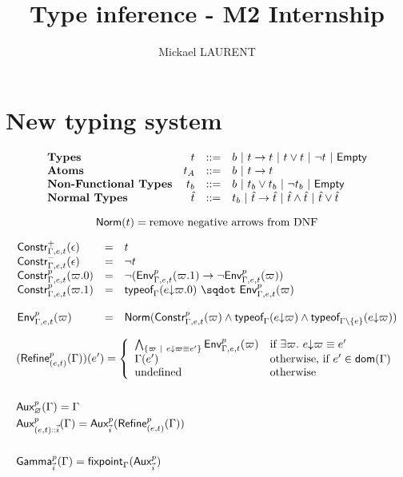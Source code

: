 \documentclass[a4paper]{article}
\title{\vspace{1.5cm}Type inference - M2 Internship}
\author{Mickael LAURENT}
\date{\vspace{-5ex}}
\theoremstyle{definition}
\begin{document}
	\maketitle

    \section{New typing system}

    \[
      \begin{array}{lrcl}
      \textbf{Types} & t & ::= & b~|~ t\to t~|~ t\vee t ~|~ \neg t ~|~ \textsf{Empty}\\
      \textbf{Atoms} & t_A & ::= & b~|~ t\to t\\
      \textbf{Non-Functional Types} & t_b & ::= & b ~|~ t_b\vee t_b ~|~ \neg t_b ~|~ \textsf{Empty}\\
      \textbf{Normal Types} & \hat t & ::= & t_b ~|~ \hat t\to \hat t~|~ \hat t \wedge \hat t ~|~ \hat t\vee \hat t
      \end{array}
    \]

    \[
      \textsf{Norm}(t) = \text{remove negative arrows from DNF}
    \]

    \[
    \begin{array}{lcl}
      \typep+\epsilon{\Gamma,e,t} & = & t\\
      \typep-\epsilon{\Gamma,e,t} & = & \neg t\\
      \typep{p}{\varpi.0}{\Gamma,e,t} & = & \neg(\arrow{\Gp p{\Gamma,e,t}{(\varpi.1)}}{\neg \Gp p {\Gamma,e,t} (\varpi)})\\
      \typep{p}{\varpi.1}{\Gamma,e,t} & = & \worra{\tyof{\occ e{\varpi.0}}\Gamma}{\Gp p {\Gamma,e,t} (\varpi)}\\ \\
      \Gp p {\Gamma,e,t} (\varpi) & = & \norm {\typep p \varpi {\Gamma,e,t} \land \tyof {\occ e \varpi} \Gamma
      \land \tyof {\occ e \varpi} {\Gamma\setminus\{e\}}}\\
    \end{array}
    \]

    \begin{align*}
      &(\textsf{Refine}^{p}_{(e,t)}(\Gamma))(e') = 
        \left\{\begin{array}{ll}
          \bigwedge_{\{\varpi ~|~ e{\downarrow}\varpi \equiv e'\}} \textsf{Env}^{p}_{\Gamma,e,t} (\varpi) & \text{if } \exists \varpi.\ e{\downarrow}\varpi \equiv e' \\
          \Gamma(e') & \text{otherwise, if } e' \in \textsf{dom}(\Gamma)\\
          \text{undefined} & \text{otherwise}
        \end{array}\right.\\&\\
      &\textsf{Aux}^{p}_{\varnothing}(\Gamma) = \Gamma\\
      &\textsf{Aux}^{p}_{{(e,t)}\textsf{::}{\vec i}}(\Gamma) = \textsf{Aux}^{p}_{\vec i}(\textsf{Refine}^{p}_{(e,t)}(\Gamma))\\&\\
      &\textsf{Gamma}^{p}_{\vec {i}}(\Gamma)=\textsf{fixpoint}_\Gamma (\textsf{Aux}^{p}_{\vec {i}})
    \end{align*}
\end{document}
